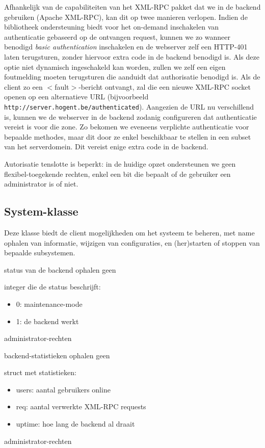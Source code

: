 Afhankelijk van de capabiliteiten van het XML-RPC pakket dat we in de backend gebruiken (Apache XML-RPC), kan dit op twee manieren verlopen. Indien de bibliotheek ondersteuning biedt voor het on-demand inschakelen van authenticatie gebaseerd op de ontvangen request, kunnen we zo wanneer benodigd \emph{basic authentication} inschakelen en de webserver zelf een HTTP-401 laten terugsturen, zonder hiervoor extra code in de backend benodigd is.
Als deze optie niet dynamisch ingeschakeld kan worden, zullen we zelf een eigen foutmelding moeten terugsturen die aanduidt dat authorisatie benodigd is. Als de client zo een $<$fault$>$-bericht ontvangt, zal die een nieuwe XML-RPC socket openen op een alternatieve URL (bijvoorbeeld \texttt{http://server.hogent.be/authenticated}). Aangezien de URL nu verschillend is, kunnen we de webserver in de backend zodanig configureren dat authenticatie vereist is voor die zone. Zo bekomen we eveneens verplichte authenticatie voor bepaalde methodes, maar dit door ze enkel beschikbaar te stellen in een subset van het serverdomein. Dit vereist enige extra code in de backend.

Autorisatie tenslotte is beperkt: in de huidige opzet ondersteunen we geen flexibel-toegekende rechten, enkel een bit die bepaalt of de gebruiker een administrator is of niet.


\subsection{System-klasse}

Deze klasse biedt de client mogelijkheden om het systeem te beheren, met name ophalen van informatie, wijzigen van configuraties, en (her)starten of stoppen van bepaalde subsystemen.

	{ status van de backend ophalen }
	{ geen }
	{ integer die de status beschrijft:
		\begin{itemize}
		\item{0: maintenance-mode}
		\item{1: de backend werkt}
		\end{itemize} }
	{ administrator-rechten }

	{ backend-statistieken ophalen }
	{ geen }
	{ struct met statistieken:
		\begin{itemize}
		\item{users: aantal gebruikers online}
		\item{req: aantal verwerkte XML-RPC requests}
		\item{uptime: hoe lang de backend al draait}
		\end{itemize} }
	{ administrator-rechten }

